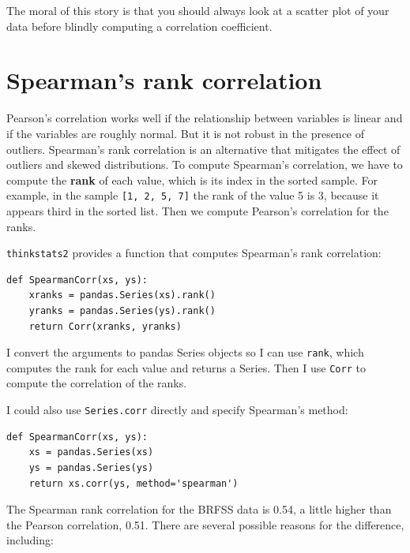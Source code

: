 \documentclass[12pt]{book}
\theoremstyle{exercise}
\begin{document}
The moral of this story is that you should always look at a scatter
plot of your data before blindly computing a correlation coefficient.%


\section{Spearman's rank correlation}

Pearson's correlation works well if the relationship between variables
is linear and if the variables are roughly normal.  But it is not
robust in the presence of outliers.%
%
%
%
%
%
%
Spearman's rank correlation is an alternative that mitigates the
effect of outliers and skewed distributions.  To compute Spearman's
correlation, we have to compute the {\bf rank} of each value, which is its
index in the sorted sample.  For example, in the sample {\tt [1, 2, 5, 7]}
the rank of the value 5 is 3, because it appears third in the sorted
list.  Then we compute Pearson's correlation for the ranks.%
%
%

{\tt thinkstats2} provides a function that computes Spearman's rank
correlation:

\begin{verbatim}
def SpearmanCorr(xs, ys):
    xranks = pandas.Series(xs).rank()
    yranks = pandas.Series(ys).rank()
    return Corr(xranks, yranks)
\end{verbatim}

I convert the arguments to pandas Series objects so I can use
{\tt rank}, which computes the rank for each value and returns
a Series.  Then I use {\tt Corr} to compute the correlation
of the ranks.%
%

I could also use {\tt Series.corr} directly and specify
Spearman's method:

\begin{verbatim}
def SpearmanCorr(xs, ys):
    xs = pandas.Series(xs)
    ys = pandas.Series(ys)
    return xs.corr(ys, method='spearman')
\end{verbatim}

The Spearman rank correlation for the BRFSS data is 0.54, a little
higher than the Pearson correlation, 0.51.  There are several possible
reasons for the difference, including:%
%
\end{document}
